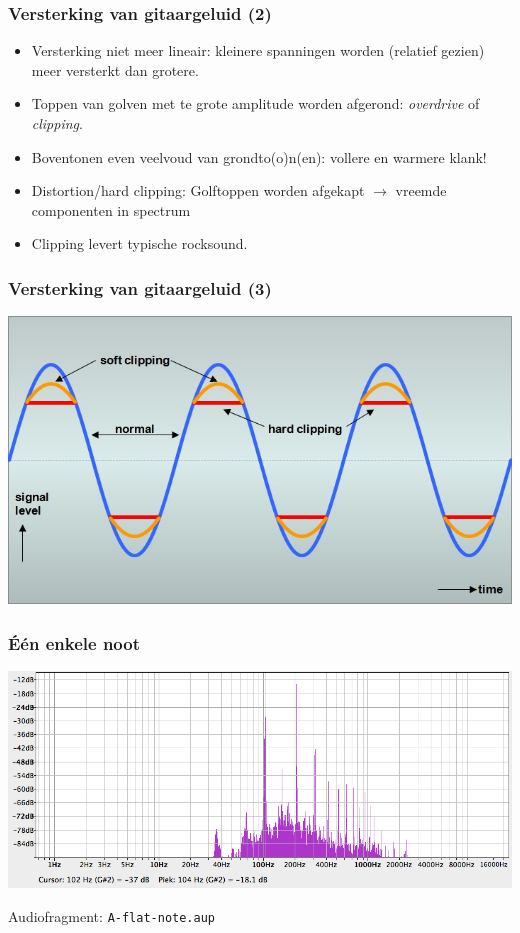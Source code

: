 \documentclass[compress, darktitle, framenumber]{beamer}
\begin{document}
\begin{frame}
\frametitle{Versterking van gitaargeluid (2)}
\begin{itemize}
\item Versterking niet meer lineair: kleinere spanningen worden (relatief gezien) meer versterkt dan grotere.
\item Toppen van golven met te grote amplitude worden afgerond: \textit{overdrive} of \textit{clipping}.
\item Boventonen even veelvoud van grondto(o)n(en): vollere en warmere klank!
\item Distortion/hard clipping: Golftoppen worden afgekapt $\rightarrow$ vreemde componenten in spectrum
\item Clipping levert typische rocksound.
\end{itemize}
\end{frame}

\begin{frame}
\frametitle{Versterking van gitaargeluid (3)}
\includegraphics[width=\textwidth]{images/clipping.png}
\end{frame}

\begin{frame}
\frametitle{\'E\'en enkele noot}
\includegraphics[width=\textwidth]{images/A-flat.png}
\begin{block}{Audiofragment:}
\texttt{A-flat-note.aup} 
\end{block}
\end{frame}
\end{document}
